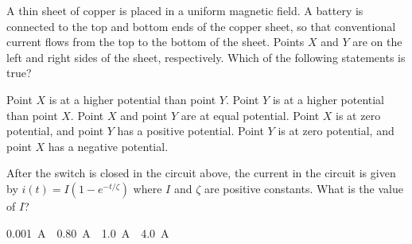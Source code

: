 \documentclass{../../../oss-apphys-exam}
\begin{document}
\begin{questions}
  \question A thin sheet of copper is placed in a uniform magnetic field. A
  battery is connected to the top and bottom ends of the copper sheet, so that
  conventional current flows from the top to the bottom of the sheet.
  Points $X$ and $Y$ are on the left and right sides of the sheet,
  respectively. Which of the following statements is true?
  \begin{center}
  \end{center}
  \begin{choices}
    \choice Point $X$ is at a higher potential than point $Y$.
    \choice Point $Y$ is at a higher potential than point $X$.
    \choice Point $X$ and point $Y$ are at equal potential.
    \choice Point $X$ is at zero potential, and point $Y$ has a positive
    potential.
    \choice Point $Y$ is at zero potential, and point $X$ has a negative
    potential.
  \end{choices}


  \question After the switch is closed in the circuit above, the current in the
  circuit is given by $i(t)=I\left(1-e^{-t/\zeta}\right)$ where $I$ and $\zeta$
  are positive constants. What is the value of $I$?
  \begin{choices}
    \choice \SI{.001}\ampere
    \choice \SI{.80}\ampere
    \choice \SI{1.0}\ampere
    \choice \SI{4.0}\ampere
  \end{choices}
  \newpage
  

\end{questions}
\end{document}
